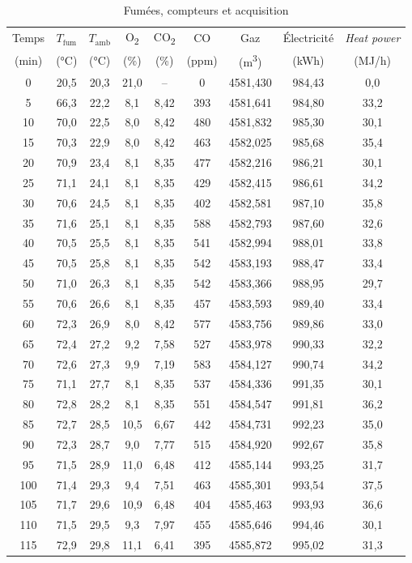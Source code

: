 \begin{table}[htbp]
  \centering
  \footnotesize
  \setlength{\tabcolsep}{3pt}
  \caption{Fumées, compteurs et acquisition}
  \label{tab:valeurs-fumees}
  \begin{tabular}{ccccccccc}
    \hline
    Temps & $T_{\mathrm{fum}}$ & $T_{\mathrm{amb}}$ & O\textsubscript{2} & CO\textsubscript{2} & CO & Gaz & Électricité & \emph{Heat power} \\
    (min) & (°C) & (°C) & (\%) & (\%) & (ppm) & (m\textsuperscript{3}) & (kWh) & (MJ/h) \\
    \hline
    0 & 20,5 & 20,3 & 21,0 & -- & 0 & 4581,430 & 984,43 & 0,0 \\
    5 & 66,3 & 22,2 & 8,1 & 8,42 & 393 & 4581,641 & 984,80 & 33,2 \\
    10 & 70,0 & 22,5 & 8,0 & 8,42 & 480 & 4581,832 & 985,30 & 30,1 \\
    15 & 70,3 & 22,9 & 8,0 & 8,42 & 463 & 4582,025 & 985,68 & 35,4 \\
    20 & 70,9 & 23,4 & 8,1 & 8,35 & 477 & 4582,216 & 986,21 & 30,1 \\
    25 & 71,1 & 24,1 & 8,1 & 8,35 & 429 & 4582,415 & 986,61 & 34,2 \\
    30 & 70,6 & 24,5 & 8,1 & 8,35 & 402 & 4582,581 & 987,10 & 35,8 \\
    35 & 71,6 & 25,1 & 8,1 & 8,35 & 588 & 4582,793 & 987,60 & 32,6 \\
    40 & 70,5 & 25,5 & 8,1 & 8,35 & 541 & 4582,994 & 988,01 & 33,8 \\
    45 & 70,5 & 25,8 & 8,1 & 8,35 & 542 & 4583,193 & 988,47 & 33,4 \\
    50 & 71,0 & 26,3 & 8,1 & 8,35 & 542 & 4583,366 & 988,95 & 29,7 \\
    55 & 70,6 & 26,6 & 8,1 & 8,35 & 457 & 4583,593 & 989,40 & 33,4 \\
    60 & 72,3 & 26,9 & 8,0 & 8,42 & 577 & 4583,756 & 989,86 & 33,0 \\
    65 & 72,4 & 27,2 & 9,2 & 7,58 & 527 & 4583,978 & 990,33 & 32,2 \\
    70 & 72,6 & 27,3 & 9,9 & 7,19 & 583 & 4584,127 & 990,74 & 34,2 \\
    75 & 71,1 & 27,7 & 8,1 & 8,35 & 537 & 4584,336 & 991,35 & 30,1 \\
    80 & 72,8 & 28,2 & 8,1 & 8,35 & 551 & 4584,547 & 991,81 & 36,2 \\
    85 & 72,7 & 28,5 & 10,5 & 6,67 & 442 & 4584,731 & 992,23 & 35,0 \\
    90 & 72,3 & 28,7 & 9,0 & 7,77 & 515 & 4584,920 & 992,67 & 35,8 \\
    95 & 71,5 & 28,9 & 11,0 & 6,48 & 412 & 4585,144 & 993,25 & 31,7 \\
    100 & 71,4 & 29,3 & 9,4 & 7,51 & 463 & 4585,301 & 993,54 & 37,5 \\
    105 & 71,7 & 29,6 & 10,9 & 6,48 & 404 & 4585,463 & 993,93 & 36,6 \\
    110 & 71,5 & 29,5 & 9,3 & 7,97 & 455 & 4585,646 & 994,46 & 30,1 \\
    115 & 72,9 & 29,8 & 11,1 & 6,41 & 395 & 4585,872 & 995,02 & 31,3 \\
    \hline
  \end{tabular}
\end{table}


